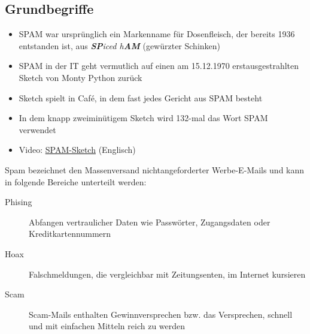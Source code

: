 \subsection{Grundbegriffe}


\begin{frame}
\begin{itemize}
	\item SPAM war ursprünglich ein Markenname für Dosenfleisch, der bereits 1936 entstanden ist, aus \textit{\textbf{SP}iced h\textbf{AM}} (gewürzter Schinken)
	\item SPAM in der IT geht vermutlich auf einen am 15.12.1970 erstausgestrahlten Sketch von Monty Python zurück
	\item Sketch spielt in Café, in dem fast jedes Gericht aus SPAM besteht
	\item In dem knapp zweiminütigem Sketch wird 132-mal das Wort SPAM verwendet
	\item Video: \href{https://www.dailymotion.com/video/x2hwqlw}{SPAM-Sketch} (Englisch)
\end{itemize}
\end{frame}

\begin{frame}
Spam bezeichnet den Massenversand nichtangeforderter Werbe-E-Mails und kann in folgende Bereiche unterteilt werden:
\begin{description}
	\item[Phising] Abfangen vertraulicher Daten wie Passwörter, Zugangsdaten oder Kreditkartennummern
	\item[Hoax] Falschmeldungen, die vergleichbar mit Zeitungsenten, im Internet kursieren
	\item[Scam] Scam-Mails enthalten Gewinnversprechen bzw. das Versprechen, schnell und mit einfachen Mitteln reich zu werden
\end{description}
\end{frame}


